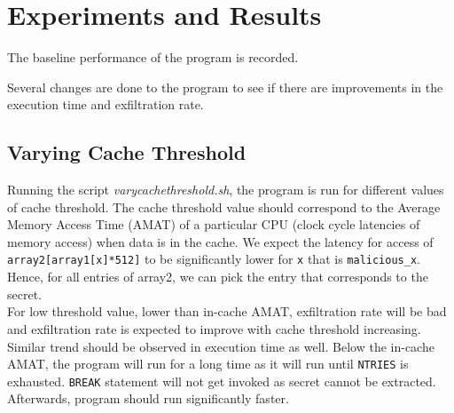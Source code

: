 \documentclass[10pt,twocolumn,letterpaper]{article}
\begin{document}
	
\section{Experiments and Results}
The baseline performance of the program is recorded.\\
\begin{table}[htb]
	\begin{center}
		\caption{Baseline program performance}
		\label{tab:baseline}
	\end{center}
\end{table}

Several changes are done to the program to see if there are improvements in the execution time and exfiltration rate.
\subsection{Varying Cache Threshold}
Running the script \textit{varycachethreshold.sh}, the program is run for different values of cache threshold. The cache threshold value  should correspond to the Average Memory Access Time (AMAT) of a particular CPU (clock cycle latencies of memory access) when data is in the cache. We expect the latency for access of \lstinline{array2[array1[x]*512]} to be significantly lower for \texttt{x} that is \lstinline{malicious_x}. Hence, for all entries of array2, we can pick the entry that corresponds to the secret.\\ 
For low threshold value, lower than in-cache AMAT, exfiltration rate will be bad and exfiltration rate is expected to improve with cache threshold increasing.\\
Similar trend should be observed in execution time as well. Below the in-cache AMAT, the program will run for a long time as it will run until \texttt{NTRIES} is exhausted. \texttt{BREAK} statement will not get invoked as secret cannot be extracted. Afterwards, program should run significantly faster.
\end{document}
